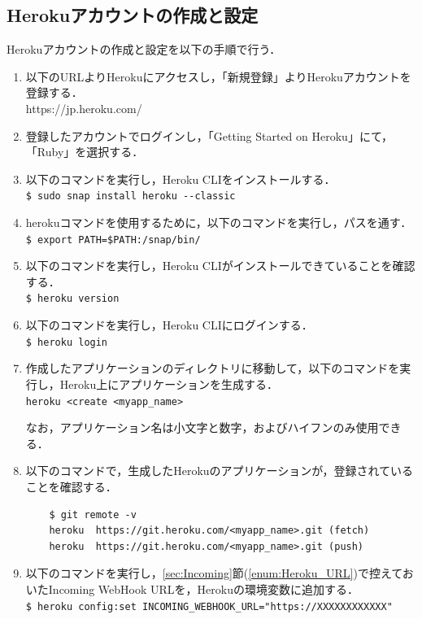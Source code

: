 \documentclass[12pt]{jsarticle}
\begin{document}
\subsection{Herokuアカウントの作成と設定}\label{sec:setup_Heroku}
Herokuアカウントの作成と設定を以下の手順で行う．
\begin{enumerate}
\item 以下のURLよりHerokuにアクセスし，「新規登録」よりHerokuアカウントを登録する．\\
  https://jp.heroku.com/
\item 登録したアカウントでログインし，「Getting Started on Heroku」にて，「Ruby」を選択する．
\item 以下のコマンドを実行し，Heroku CLIをインストールする．\\
 \verb|$ sudo snap install heroku --classic|
\item herokuコマンドを使用するために，以下のコマンドを実行し，パスを通す．\\
  \verb|$ export PATH=$PATH:/snap/bin/|
\item 以下のコマンドを実行し，Heroku CLIがインストールできていることを確認する．\\
  \verb|$ heroku version|
\item 以下のコマンドを実行し，Heroku CLIにログインする．\\
  \verb|$ heroku login|
\item\label{enum:app} 作成したアプリケーションのディレクトリに移動して，以下のコマンドを実行し，Heroku上にアプリケーションを生成する．\\
  \verb|heroku <create <myapp_name>|
  
  なお，アプリケーション名は小文字と数字，およびハイフンのみ使用できる．
\item 以下のコマンドで，生成したHerokuのアプリケーションが，登録されていることを確認する．\\
  \begin{verbatim}
    $ git remote -v
    heroku	https://git.heroku.com/<myapp_name>.git (fetch)
    heroku	https://git.heroku.com/<myapp_name>.git (push)
  \end{verbatim}
\item\label{enum:in_URL} 以下のコマンドを実行し，\ref{sec:Incoming}節(\ref{enum:Heroku_URL})で控えておいたIncoming WebHook URLを，Herokuの環境変数に追加する．\\
  \verb|$ heroku config:set INCOMING_WEBHOOK_URL="https://XXXXXXXXXXXX"|
\end{enumerate}
\end{document}
